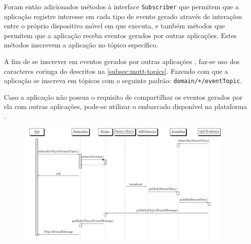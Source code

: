 Foram então adicionados métodos à interface \texttt{Subscriber} que permitem que a aplicação registre interesse em cada tipo de evento gerado através de interações entre \smartobjs o próprio dispositivo móvel em que executa, e também métodos que permitem que a aplicação receba eventos gerados por outras aplicações. Estes métodos inscrevem a aplicação no tópico \mqtt específico.

A fim de se inscrever em eventos gerados por outras aplicações \mhubcddl, faz-se uso dos caracteres coringa do \mqtt descritos na \autoref{subsec:mqtt-topics}. Fazendo com que a aplicação se inscreva em tópicos com o seguinte padrão: \texttt{domain/+/eventTopic}.

Caso a aplicação não possua o requisito de compartilhar os eventos gerados por ela com outras aplicações, pode-se utilizar o \ubroker embarcado disponível na plataforma \mhubcddl.

\begin{figure}[htb]
	\centering
	\includegraphics[width=0.95\textwidth]{img/solution-sequence.pdf}
\end{figure}

